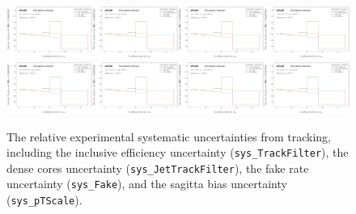 \begin{figure}[h!]
\includegraphics[width=0.25\textwidth,page=17]{figures/SimResults/MultiFold_TrackJet_SystEffect.pdf}\includegraphics[width=0.25\textwidth,page=18]{figures/SimResults/MultiFold_TrackJet_SystEffect.pdf}\includegraphics[width=0.25\textwidth,page=19]{figures/SimResults/MultiFold_TrackJet_SystEffect.pdf}\includegraphics[width=0.25\textwidth,page=20]{figures/SimResults/MultiFold_TrackJet_SystEffect.pdf}\\
\includegraphics[width=0.25\textwidth,page=21]{figures/SimResults/MultiFold_TrackJet_SystEffect.pdf}\includegraphics[width=0.25\textwidth,page=22]{figures/SimResults/MultiFold_TrackJet_SystEffect.pdf}\includegraphics[width=0.25\textwidth,page=23]{figures/SimResults/MultiFold_TrackJet_SystEffect.pdf}\includegraphics[width=0.25\textwidth,page=24]{figures/SimResults/MultiFold_TrackJet_SystEffect.pdf}
\caption{The relative experimental systematic uncertainties from tracking, including the inclusive efficiency uncertainty (\texttt{sys\_TrackFilter}), the dense cores uncertainty (\texttt{sys\_JetTrackFilter}), the fake rate uncertainty (\texttt{sys\_Fake}), and the sagitta bias uncertainty (\texttt{sys\_pTScale}).}
\label{fig:simresultsmulti_trackjetuncertsl}
\end{figure}

